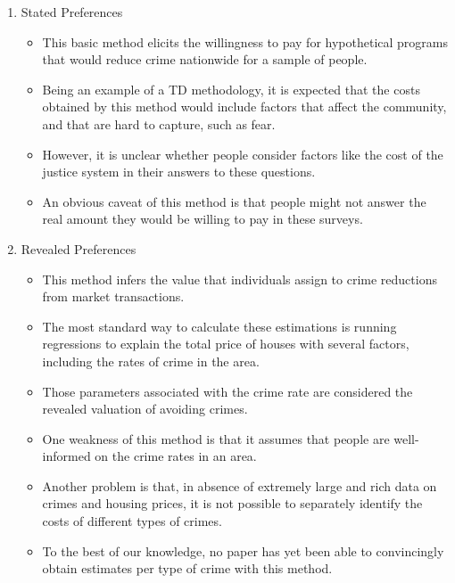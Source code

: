 \documentclass[static]{JJH-Beamer}
\begin{document}
\begin{frame}

\begin{enumerate}
\item Stated Preferences
    \begin{itemize}
    \item This basic method elicits the willingness to pay for hypothetical programs that would reduce crime nationwide for a sample of people.
    \item Being an example of a TD methodology, it is expected that the costs obtained by this method would include factors that affect the community, and that are hard to capture, such as fear.
    \item However, it is unclear whether people consider factors like the cost of the justice system in their answers to these questions.
    \item An obvious caveat of this method is that people might not answer the real amount they would be willing to pay in these surveys.
    \end{itemize}
\end{enumerate}

\end{frame}

\begin{frame}

\begin{enumerate}
\setcounter{enumi}{1}
\item Revealed Preferences
    \begin{itemize}
    \item This method infers the value that individuals assign to crime reductions from market transactions.
    \item The most standard way to calculate these estimations is running regressions to explain the total price of houses with several factors, including the rates of crime in the area.
    \item Those parameters associated with the crime rate are considered the revealed valuation of avoiding crimes.
    \item One weakness of this method is that it assumes that people are well-informed on the crime rates in an area.
    \item Another problem is that, in absence of extremely large and rich data on crimes and housing prices, it is not possible to separately identify the costs of different types of crimes.
    \item To the best of our knowledge, no paper has yet been able to convincingly obtain estimates per type of crime with this method.
    \end{itemize}
\end{enumerate}

\end{frame}
\end{document}
